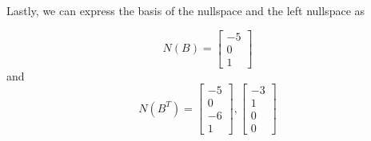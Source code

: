 Lastly, we can express the basis of the nullspace and the left nullspace as
\begin{mdframed}[style=MyFrame]
    \begin{equation}
        N(B) = 
        \begin{bmatrix}
            -5      \\
            0       \\
            1
        \end{bmatrix}
    \end{equation}
    and 
    \begin{equation}
        N(B^{T}) = 
        \begin{bmatrix}
            -5      \\
            0       \\
            -6      \\
            1
        \end{bmatrix},
        \begin{bmatrix}
            -3      \\
            1       \\
            0       \\
            0
        \end{bmatrix}
    \end{equation}
\end{mdframed}
